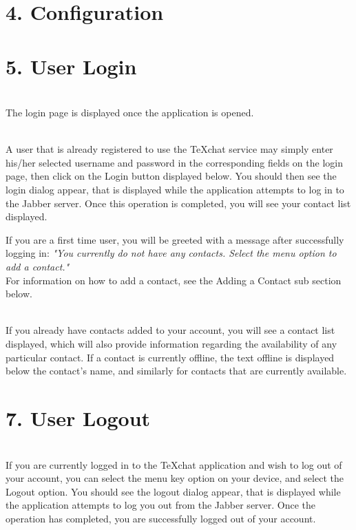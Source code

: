 \documentclass[29pt,a4paper]{moderncv}
\begin{document}
\newpage
	\section*{4. Configuration}
\newpage
		
\newpage
		\section*{5. User Login}
		\vspace{4mm}
		\\The login page is displayed once the application is opened.  
		
		\\A user that is already registered to use the TeXchat service may simply enter his/her selected username and password in the corresponding fields on the login page, then click on the Login button displayed below.  You should then see the login dialog appear, that is displayed while the application attempts to log in to the Jabber server.  Once this operation is completed, you will see your contact list displayed. 
		
		If you are a first time user, you will be greeted with a message after successfully logging in: \textit{"You currently do not have any contacts.  Select the menu option to add a contact."} 
		\\For information on how to add a contact, see the Adding a Contact sub section below.
		
		\\If you already have contacts added to your account, you will see a contact list displayed, which will also provide information regarding the availability of any particular contact.  If a contact is currently offline, the text offline is displayed below the contact’s name, and similarly for contacts that are currently available.
		\vspace{5mm}

\newpage
		\section*{7. User Logout}
		\vspace{5mm}
		\\If you are currently logged in to the TeXchat application and wish to log out of your account, you can select the menu key option on your device, and select the Logout option.  You should see the logout dialog appear, that is displayed while the application attempts to log you out from the Jabber server.  Once the operation has completed, you are successfully logged out of your account.
		\vspace{4mm}
\end{document}
